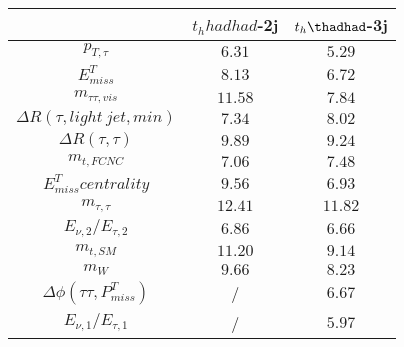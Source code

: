 \centering
\begin{tabular}{|c|c|c|} \hline
  & $t_h	hadhad$-2j & $t_h\thadhad$-3j \\\hline
$p_{T,\tau }$ & $6.31$ & $5.29$\\\hline
$E^{T}_{miss}$ & $8.13$ & $6.72$\\\hline
$m_{\tau \tau ,vis}$ & $11.58$ & $7.84$\\\hline
$\Delta R(\tau ,light~jet,min)$ & $7.34$ & $8.02$\\\hline
$\Delta R(\tau ,\tau )$ & $9.89$ & $9.24$\\\hline
$m_{t,FCNC}$ & $7.06$ & $7.48$\\\hline
$E^{T}_{miss} centrality$ & $9.56$ & $6.93$\\\hline
$m_{\tau ,\tau }$ & $12.41$ & $11.82$\\\hline
$E_{\nu,2}/E_{\tau ,2}$ & $6.86$ & $6.66$\\\hline
$m_{t,SM}$ & $11.20$ & $9.14$\\\hline
$m_{W}$ & $9.66$ & $8.23$\\\hline
$\Delta\phi(\tau \tau ,P^{T}_{miss})$ &  / & $6.67$\\\hline
$E_{\nu,1}/E_{\tau ,1}$ &  / & $5.97$\\\hline
\end{tabular}

